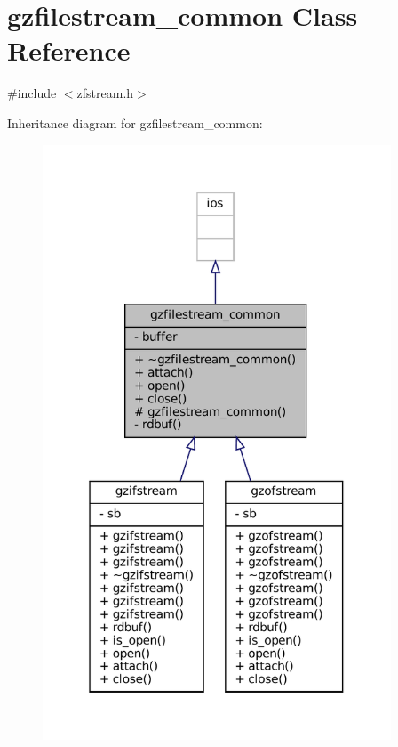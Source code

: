 \hypertarget{classgzfilestream__common}{}\section{gzfilestream\+\_\+common Class Reference}
\label{classgzfilestream__common}


{\ttfamily \#include $<$zfstream.\+h$>$}



Inheritance diagram for gzfilestream\+\_\+common\+:
\nopagebreak
\begin{figure}[H]
\begin{center}
\leavevmode
\includegraphics[width=294pt]{classgzfilestream__common__inherit__graph}
\end{center}
\end{figure}


